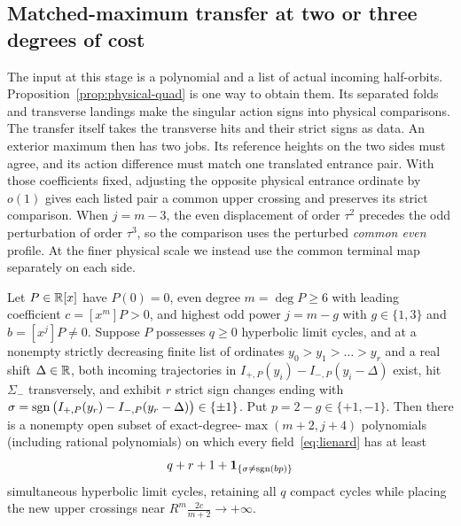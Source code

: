 \subsection{Matched-maximum transfer at two or three degrees of cost}\label{subsec:cap-transfer}
The input at this stage is a polynomial and a list of actual incoming
half-orbits. Proposition~\ref{prop:physical-quad} is one way to obtain
them. Its separated folds and transverse landings make the singular
action signs into physical comparisons. The transfer itself takes the
transverse hits and their strict signs as data. An exterior maximum
then has two jobs. Its reference heights on the two sides must agree,
and its action difference must match one translated entrance pair.
With those coefficients fixed, adjusting the opposite physical entrance
ordinate by $o(1)$ gives each listed pair a common upper crossing and
preserves its strict comparison.
When $j=m-3$, the even displacement of order $\tau^2$ precedes the odd
perturbation of order $\tau^3$, so the comparison uses the perturbed
\emph{common even} profile. At the finer physical scale we instead use
the common terminal map separately on each side.

\begin{proposition}\label{prop:cap-transfer}
Let $P\in\mathbb{R}[x]$ have $P(0)=0$, even degree $m=\deg P\ge 6$ with leading coefficient $c=[x^m]P>0$, and highest odd power $j=m-g$ with $g\in\{1,3\}$ and $b=[x^j]P\neq 0$. Suppose $P$ possesses $q\ge 0$ hyperbolic limit cycles, and at a nonempty strictly decreasing finite list of ordinates $y_0>y_1>\dots>y_r$ and a real shift $\Delta\in\mathbb{R}$, both incoming trajectories in $I_{+,P}(y_i)-I_{-,P}(y_i-\Delta)$ exist, hit $\Sigma_-$ transversely, and exhibit $r$ strict sign changes ending with $\sigma=\operatorname{sgn}\big(I_{+,P}(y_r)-I_{-,P}(y_r-\Delta)\big)\in\{\pm 1\}$. Put $p=2-g\in\{+1,-1\}$. Then there is a nonempty open subset of exact-degree-$\max(m+2,j+4)$ polynomials (including rational polynomials) on which every field~\eqref{eq:lienard} has at least
\begin{equation}\label{eq:cap-count}
  q + r + 1 + \mathbf{1}_{\{\sigma\neq\operatorname{sgn}(bp)\}}
\end{equation}
simultaneous hyperbolic limit cycles, retaining all $q$ compact cycles while placing the new upper crossings near $R^m\frac{2c}{m+2}\to+\infty$.
\end{proposition}



